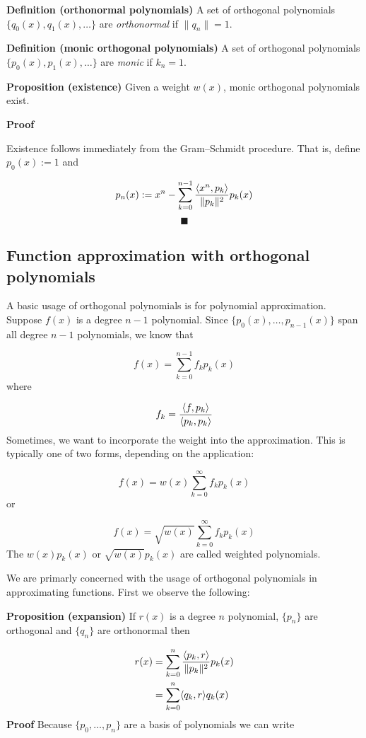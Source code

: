 \documentclass[12pt,a4paper]{article}
\def\endash{–}
\begin{document}
\textbf{Definition (orthonormal polynomials)} A set of orthogonal polynomials $\{q_0(x), q_1(x), \ensuremath{\ldots} \}$ are \emph{orthonormal} if $\|q_n\| = 1$.

\textbf{Definition (monic orthogonal polynomials)} A set of orthogonal polynomials $\{p_0(x), p_1(x), \ensuremath{\ldots} \}$ are \emph{monic} if $k_n = 1$.

\textbf{Proposition (existence)} Given a weight $w(x)$, monic orthogonal polynomials exist.

\textbf{Proof}

Existence follows immediately from the Gram\ensuremath{\endash}Schmidt procedure. That is, define $p_0(x) := 1$ and

\[
p_n(x) := x^n - \ensuremath{\sum}_{k=0}^{n-1} {\ensuremath{\langle}x^n,p_k\ensuremath{\rangle} \over \|p_k\|^2} p_k(x)
\]
\[
\blacksquare
\]
\subsection{Function approximation with orthogonal polynomials}
A basic usage of orthogonal polynomials is for polynomial approximation. Suppose $f(x)$ is a degree $n-1$ polynomial. Since $\{p_0(x),\ldots,p_{n-1}(x)\}$ span all degree $n-1$ polynomials, we know that

\[
f(x) = \sum_{k=0}^{n-1} f_k p_k(x)
\]
where

\[
f_k = {\langle f, p_k \rangle \over \langle p_k,p_k \rangle}
\]
Sometimes, we want to incorporate the weight into the approximation. This is typically one of two forms, depending on the application:

\[
f(x) = w(x) \sum_{k=0}^\infty f_k p_k(x)
\]
or

\[
        f(x) = \sqrt{w(x)} \sum_{k=0}^\infty f_k p_k(x)
\]
The $w(x)p_k(x)$ or $\sqrt{w(x)}p_k(x)$ are called weighted polynomials.

We are primarly concerned with the usage of orthogonal polynomials in approximating functions. First we observe the following:

\textbf{Proposition (expansion)} If $r(x)$ is a degree $n$ polynomial, $\{p_n\}$ are orthogonal and $\{q_n\}$ are orthonormal then


\begin{align*}
r(x) &= \ensuremath{\sum}_{k=0}^n {\ensuremath{\langle}p_k,r\ensuremath{\rangle} \over \|p_k\|^2} p_k(x) \\
     &    = \ensuremath{\sum}_{k=0}^n \ensuremath{\langle}q_k,r\ensuremath{\rangle} q_k(x)
\end{align*}
\textbf{Proof} Because $\{p_0,\ensuremath{\ldots},p_n \}$ are a basis of polynomials we can write
\end{document}
